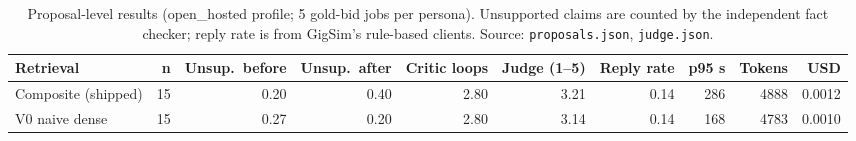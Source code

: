 \begin{table}[t]\centering\small\caption{Proposal-level results (open\_hosted profile; 5 gold-bid jobs per persona). Unsupported claims are counted by the independent fact checker; reply rate is from GigSim's rule-based clients. Source: \texttt{proposals.json}, \texttt{judge.json}.}\label{tab:prop}
\begin{tabular}{lrrrrrrrrr}\toprule Retrieval & n & Unsup.\ before & Unsup.\ after & Critic loops & Judge (1--5) & Reply rate & p95 s & Tokens & USD\\\midrule
Composite (shipped) & 15 & 0.20 & 0.40 & 2.80 & 3.21 & 0.14 & 286 & 4888 & 0.0012 \\
V0 naive dense & 15 & 0.27 & 0.20 & 2.80 & 3.14 & 0.14 & 168 & 4783 & 0.0010 \\
\bottomrule\end{tabular}\end{table}